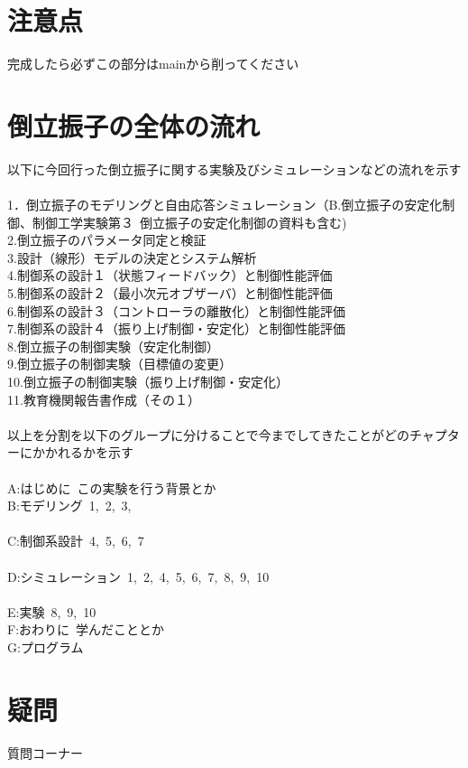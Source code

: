 \section{注意点}
完成したら必ずこの部分はmainから削ってください

\section{倒立振子の全体の流れ}
以下に今回行った倒立振子に関する実験及びシミュレーションなどの流れを示す\\
\\
1．倒立振子のモデリングと自由応答シミュレーション（B.倒立振子の安定化制御、制御工学実験第３\ 倒立振子の安定化制御の資料も含む)\\
2.倒立振子のパラメータ同定と検証\\
3.設計（線形）モデルの決定とシステム解析\\
4.制御系の設計１（状態フィードバック）と制御性能評価\\
5.制御系の設計２（最小次元オブザーバ）と制御性能評価\\
6.制御系の設計３（コントローラの離散化）と制御性能評価\\
7.制御系の設計４（振り上げ制御・安定化）と制御性能評価\\
8.倒立振子の制御実験（安定化制御）\\
9.倒立振子の制御実験（目標値の変更）\\
10.倒立振子の制御実験（振り上げ制御・安定化）\\
11.教育機関報告書作成（その１）\\
\\
以上を分割を以下のグループに分けることで今までしてきたことがどのチャプターにかかれるかを示す\\
\\
A:はじめに\ この実験を行う背景とか\\
B:モデリング\ 1,\ 2,\ 3,\\
\\
C:制御系設計\ 4,\ 5,\ 6,\ 7\\
\\
D:シミュレーション\ 1,\ 2,\ 4,\ 5,\ 6,\ 7,\ 8,\ 9,\ 10\\
\\
E:実験\ 8,\ 9,\ 10\\
F:おわりに\ 学んだこととか\\
G:プログラム\ 

\section{疑問}
質問コーナー\\

